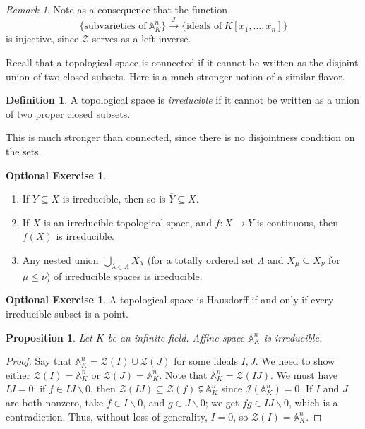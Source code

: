 \documentclass{amsart}[12pt]
\newcommand{\A}{\mathbb{A}}
\newcommand{\cZ}{\mathcal{Z}}
\newcommand{\cI}{\mathcal{I}}
\numberwithin{equation}{section}
\theoremstyle{plain} %
\newtheorem{prop}[equation]{Proposition}
\theoremstyle{definition}
\newtheorem{defn}[equation]{Definition}
\newtheorem{exer}[equation]{Optional Exercise}
\theoremstyle{remark}
\newtheorem{rem}[equation]{Remark}
\newcommand{\xra}[1]{\xrightarrow{#1}}
\begin{document}
\begin{rem} Note as a consequence that the function
\[ \{ \text{subvarieties of} \ \A^n_K\} \xra{\cI} \{ \text{ideals of} \ K[x_1,\dots,x_n] \} \]
is injective, since $\cZ$ serves as a left inverse.
\end{rem}


Recall that a topological space is connected if it cannot be written as the disjoint union of two closed subsets. Here is a much stronger  notion of a similar flavor.

\begin{defn} A topological space is \emph{irreducible} if it cannot be written as a union of two proper closed subsets.
\end{defn}

This is much stronger than connected, since there is no disjointness condition on the sets.

\begin{exer}
\begin{enumerate}
\item If $Y\subseteq X$ is irreducible, then so is $\overline{Y} \subseteq X$.
\item If $X$ is an irreducible topological space, and $f:X\to Y$ is continuous, then $f(X)$ is irreducible.
\item Any nested union $\bigcup_{\lambda\in \Lambda} X_\lambda$ (for a totally ordered set $\Lambda$ and $X_\mu \subseteq X_\nu$ for $\mu\leq \nu$) of irreducible spaces is irreducible.
\end{enumerate}
\end{exer}

\begin{exer}
A topological space is Hausdorff if and only if every irreducible subset is a point.
\end{exer}



\begin{prop} Let $K$ be an infinite field. Affine space $\A^n_K$ is irreducible. 
\end{prop}
\begin{proof} Say that $\A^n_K = \cZ(I) \cup \cZ(J)$ for some ideals $I,J$. We need to show either $\cZ(I) =\A^n_K$ or $\cZ(J) = \A^n_K$. Note that $\A^n_K = \cZ(IJ)$. We must have $IJ=0$: if $f\in IJ\smallsetminus 0$, then $\cZ(IJ)\subseteq \cZ(f) \subsetneqq \A^n_K$ since $\cI(\A^n_K) = 0$. If $I$ and $J$ are both nonzero, take $f\in I\smallsetminus 0$, and $g\in J \smallsetminus 0$; we get $fg\in IJ \smallsetminus 0$, which is a contradiction. Thus, without loss of generality, $I=0$, so $\cZ(I) = \A^n_K$.
\end{proof}
\end{document}

